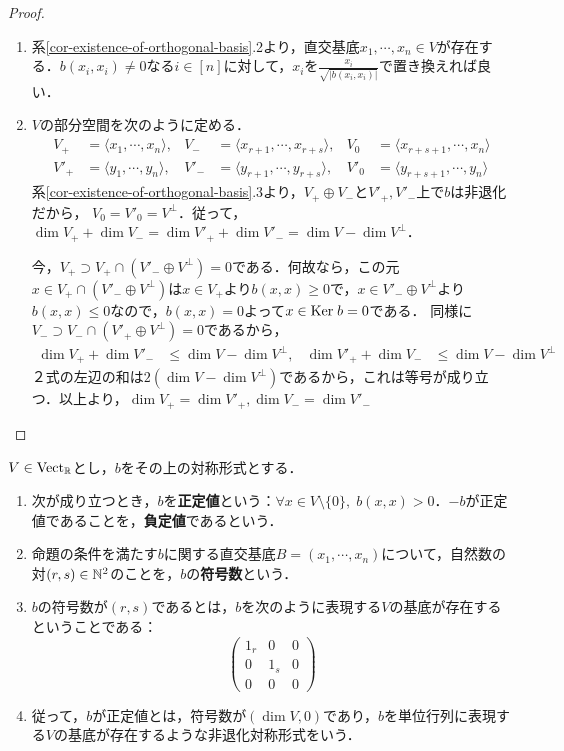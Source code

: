 \documentclass[uplatex,dvipdfmx]{jsreport}
\begin{document}
\begin{proof}\mbox{}
    \begin{enumerate}
        \item 系\ref{cor-existence-of-orthogonal-basis}.2より，直交基底$x_1,\cdots,x_n\in V$が存在する．$b(x_i,x_i)\ne 0$なる$i\in[n]$に対して，$x_i$を$\frac{x_i}{\sqrt{|b(x_i,x_i)|}}$で置き換えれば良い．
        \item $V$の部分空間を次のように定める．\begin{align*}
            V_+&=\langle x_1,\cdots,x_n\rangle,&V_-&=\langle x_{r+1},\cdots,x_{r+s}\rangle,&V_0&=\langle x_{r+s+1},\cdots,x_n\rangle\\
            V'_+&=\langle y_1,\cdots,y_n\rangle,&V'_-&=\langle y_{r+1},\cdots,y_{r+s}\rangle,&V'_0&=\langle y_{r+s+1},\cdots,y_n\rangle
        \end{align*}
        系\ref{cor-existence-of-orthogonal-basis}.3より，$V_+\oplus V_-$と$V'_+,V'_-$上で$b$は非退化だから，
        $V_0=V'_0=V^\perp$．従って，$\dim V_++\dim V_-=\dim V'_++\dim V'_-=\dim V-\dim V^\perp$．
        
        今，$V_+\supset V_+\cap(V'_-\oplus V^\perp)=0$である．何故なら，この元$x\in V_+\cap(V'_-\oplus V^\perp)$は$x\in V_+$より$b(x,x)\ge 0$で，$x\in V'_-\oplus V^\perp$より$b(x,x)\le 0$なので，$b(x,x)=0$よって$x\in\mathrm{Ker}\; b=0$である．
        同様に$V_-\supset V_-\cap(V'_+\oplus V^\perp)=0$であるから，
        \begin{align*}
            \dim V_++\dim V'_-&\le\dim V-\dim V^\perp,&\dim V'_++\dim V_-&\le\dim V-\dim V^\perp
        \end{align*}
        ２式の左辺の和は$2(\dim V-\dim V^\perp)$であるから，これは等号が成り立つ．以上より，$\dim V_+=\dim V'_+,\dim V_-=\dim V'_-$
    \end{enumerate}
\end{proof}

\begin{definition}
    $V\in\mathrm{Vect}_{\mathbb{R}}$とし，$b$をその上の対称形式とする．
    \begin{enumerate}
        \item 次が成り立つとき，$b$を\textbf{正定値}という：$\forall x\in V\setminus\{0\},\;b(x,x)>0$．$-b$が正定値であることを，\textbf{負定値}であるという．
        \item 命題の条件を満たす$b$に関する直交基底$B=(x_1,\cdots,x_n)$について，自然数の対$(r,s)\in\mathbb{N}^2$のことを，$b$の\textbf{符号数}という．
        \item $b$の符号数が$(r,s)$であるとは，$b$を次のように表現する$V$の基底が存在するということである：\[\begin{pmatrix}1_r&0&0\\0&1_s&0\\0&0&0\end{pmatrix}\]
        \item 従って，$b$が正定値とは，符号数が$(\dim V,0)$であり，$b$を単位行列に表現する$V$の基底が存在するような非退化対称形式をいう．
    \end{enumerate}
\end{definition}
\end{document}
